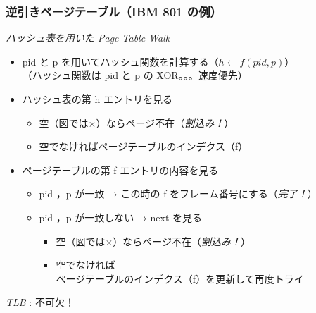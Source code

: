 \documentclass[unicode,handout]{beamer}                   %
\begin{document}
\begin{frame}
  \frametitle{逆引きページテーブル（IBM 801 の例）}
  \emph{ハッシュ表を用いた Page Table Walk}
  \begin{itemize}
  \item pid と p を用いてハッシュ関数を計算する（$h \leftarrow f(pid, p)$）\\
    （ハッシュ関数は pid と p の XOR。。。速度優先）
    \vfill
  \item ハッシュ表の第 h エントリを見る
    \begin{itemize}
      \item 空（図では×）ならページ不在（\emph{割込み！}）
      \item 空でなければページテーブルのインデクス（f）
    \end{itemize}
    \vfill
  \item ページテーブルの第 f エントリの内容を見る
    \begin{itemize}
      \item pid ，p が一致 →  この時の f をフレーム番号にする（\emph{完了！}）
      \item pid ，p が一致しない →  next を見る
        \begin{itemize}
        \item 空（図では×）ならページ不在（\emph{割込み！}）
        \item 空でなければ\\ 
          ページテーブルのインデクス（f）を更新して再度トライ
        \end{itemize}
    \end{itemize}
  \end{itemize}

  \emph{TLB} : 不可欠！
\end{frame}
\end{document}
